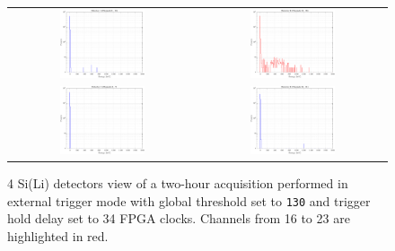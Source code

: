 \begin{figure}[h!]
    \centering
    \begin{tabular}{c c}
         \includegraphics[width=0.475\textwidth]{Images/chap3/results/muons/ch_ext_trigger_4plots/incoming_energy34_2hr_sens2_keV.pdf} & \includegraphics[width=0.475\textwidth]{Images/chap3/results/muons/ch_ext_trigger_4plots/incoming_energy34_2hr_sens3_keV.pdf} \\
         \includegraphics[width=0.475\textwidth]{Images/chap3/results/muons/ch_ext_trigger_4plots/incoming_energy34_2hr_sens1_keV.pdf} & \includegraphics[width=0.475\textwidth]{Images/chap3/results/muons/ch_ext_trigger_4plots/incoming_energy34_2hr_sens4_keV.pdf}
    \end{tabular}
    \caption{4 Si(Li) detectors view of a two-hour acquisition performed in external trigger mode with global threshold set to \texttt{130} and trigger hold delay set to 34 FPGA clocks. Channels from 16 to 23 are highlighted in red.}
    \label{figMUON4sensors}
\end{figure}

